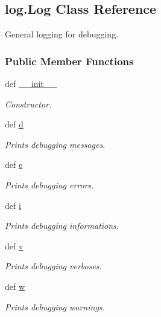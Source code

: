 \hypertarget{classlog_1_1_log}{\subsection{log.\-Log Class Reference}
\label{classlog_1_1_log}
}


General logging for debugging.  


\subsubsection*{Public Member Functions}
\begin{DoxyCompactItemize}
\item 
def \hyperlink{classlog_1_1_log_a34c3a293ac13dafb0920e3ed9ce12f9e}{\-\_\-\-\_\-init\-\_\-\-\_\-}
\begin{DoxyCompactList}\small\item\em Constructor. \end{DoxyCompactList}\item 
def \hyperlink{classlog_1_1_log_ad6426a4b93f68df70f6e1e5a867f3857}{d}
\begin{DoxyCompactList}\small\item\em Prints debugging messages. \end{DoxyCompactList}\item 
def \hyperlink{classlog_1_1_log_a37397ea7183e194e289bad1aa5211292}{e}
\begin{DoxyCompactList}\small\item\em Prints debugging errors. \end{DoxyCompactList}\item 
def \hyperlink{classlog_1_1_log_a6a6afff0318323603960f0fb97a3d66d}{i}
\begin{DoxyCompactList}\small\item\em Prints debugging informations. \end{DoxyCompactList}\item 
def \hyperlink{classlog_1_1_log_a5cdb817375c3851ca60540fa58627a7f}{v}
\begin{DoxyCompactList}\small\item\em Prints debugging verboses. \end{DoxyCompactList}\item 
def \hyperlink{classlog_1_1_log_ac88cf5dd0c7f8501f2c283403f148bf0}{w}
\begin{DoxyCompactList}\small\item\em Prints debugging warnings. \end{DoxyCompactList}\item 

\end{DoxyCompactItemize}
